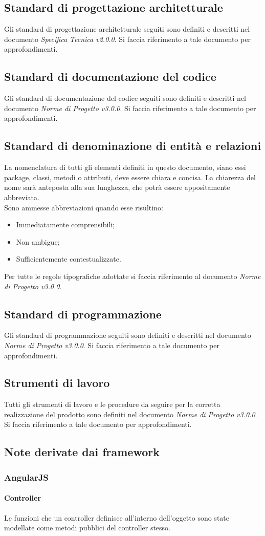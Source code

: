 \subsection{Standard di progettazione architetturale}
Gli standard di progettazione architetturale seguiti sono definiti e descritti nel documento \textit{Specifica Tecnica v2.0.0}. Si faccia riferimento a tale
documento per approfondimenti.

\subsection{Standard di documentazione del codice}
Gli standard di documentazione del codice seguiti sono definiti e descritti nel documento \textit{Norme di Progetto v3.0.0}. Si faccia riferimento a tale
documento per approfondimenti.

\subsection{Standard di denominazione di entità e relazioni}
La nomenclatura di tutti gli elementi definiti in questo documento, siano essi package, classi, metodi o attributi, deve essere chiara e concisa. 
La chiarezza del nome sarà anteposta alla sua lunghezza, che potrà essere appositamente abbreviata. \\
\noindent Sono ammesse abbreviazioni quando esse risultino:
\begin{itemize}
	 \item Immediatamente comprensibili;
	 \item Non ambigue;
	 \item Sufficientemente contestualizzate.
\end{itemize}
Per tutte le regole tipografiche adottate si faccia riferimento al documento \textit{Norme di Progetto v3.0.0}.

\subsection{Standard di programmazione}
Gli standard di programmazione seguiti sono definiti e descritti nel documento \textit{Norme di Progetto v3.0.0}. Si faccia riferimento a tale
documento per approfondimenti.

\subsection{Strumenti di lavoro}
Tutti gli strumenti di lavoro e le procedure da seguire per la corretta realizzazione del prodotto sono definiti nel documento \textit{Norme di Progetto v3.0.0}.
Si faccia riferimento a tale documento per approfondimenti.

\subsection{Note derivate dai framework}
	\subsubsection{AngularJS}
		\paragraph{Controller}
		Le funzioni che un controller definisce all'interno dell'oggetto \SCOPE sono state modellate come metodi pubblici del controller stesso.